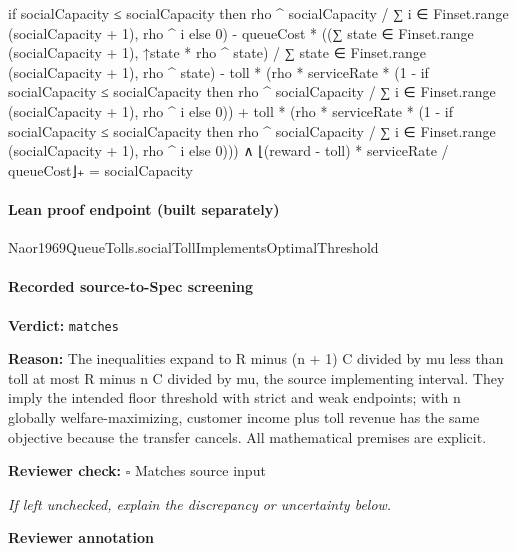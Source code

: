 \documentclass[10pt]{article}
\newcommand{\reviewerbox}{%
  \par\noindent\fbox{\parbox{0.96\linewidth}{\rule{0pt}{0.38in}}}\par
}
\newcommand{\reviewmatch}[1]{%
  \par\noindent\textbf{Reviewer check:} $\square$\; #1\par
  \noindent\emph{If left unchecked, explain the discrepancy or uncertainty below.}\par
}
\begin{document}
\begin{ReviewVerbatim}
                                if socialCapacity ≤ socialCapacity then
                                  rho ^ socialCapacity / ∑ i ∈ Finset.range (socialCapacity + 1), rho ^ i
                                else 0) -
                            queueCost *
                              ((∑ state ∈ Finset.range (socialCapacity + 1), ↑state * rho ^ state) /
                                ∑ state ∈ Finset.range (socialCapacity + 1), rho ^ state) -
                          toll *
                            (rho * serviceRate *
                              (1 -
                                if socialCapacity ≤ socialCapacity then
                                  rho ^ socialCapacity / ∑ i ∈ Finset.range (socialCapacity + 1), rho ^ i
                                else 0)) +
                        toll *
                          (rho * serviceRate *
                            (1 -
                              if socialCapacity ≤ socialCapacity then
                                rho ^ socialCapacity / ∑ i ∈ Finset.range (socialCapacity + 1), rho ^ i
                              else 0))) ∧
                  ⌊(reward - toll) * serviceRate / queueCost⌋₊ = socialCapacity
\end{ReviewVerbatim}



\paragraph{Lean proof endpoint (built separately)}\begin{ReviewVerbatim}
Naor1969QueueTolls.socialTollImplementsOptimalThreshold
\end{ReviewVerbatim}

\paragraph{Recorded source-to-Spec screening}
\textbf{Verdict:} \texttt{matches}
\\
{\raggedright
\textbf{Reason:} The inequalities expand to R minus (n + 1) C divided by mu less than toll at most R minus n C divided by mu, the source implementing interval.\allowbreak{} They imply the intended floor threshold with strict and weak endpoints;\allowbreak{} with n globally welfare-\allowbreak{}maximizing, customer income plus toll revenue has the same objective because the transfer cancels.\allowbreak{} All mathematical premises are explicit.\allowbreak{}
\par}
\reviewmatch{Matches source input}
\noindent\textbf{Reviewer annotation}\par
\reviewerbox
\clearpage
\hypertarget{source-claim-3988619b76c2b2f2}{}
\end{document}
